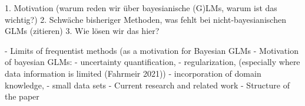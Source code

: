 
1. Motivation (warum reden wir über bayesianische (G)LMs, warum ist das wichtig?)
2. Schwäche bisheriger Methoden, was fehlt bei nicht-bayesianischen GLMs (zitieren)
3. Wie lösen wir das hier?

- Limits of frequentist methods (as a motivation for Bayesian GLMs
- Motivation of bayesian GLMs:
    - uncertainty quantification,
    - regularization, (especially where data information is limited (Fahrmeir 2021))
    - incorporation of domain knowledge,
    - small data sets
- Current research and related work
- Structure of the paper